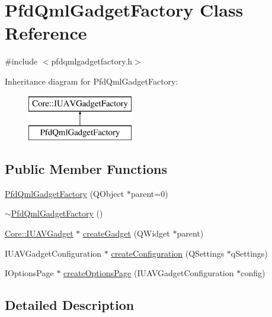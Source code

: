 \hypertarget{class_pfd_qml_gadget_factory}{\section{\-Pfd\-Qml\-Gadget\-Factory \-Class \-Reference}
\label{class_pfd_qml_gadget_factory}
}


{\ttfamily \#include $<$pfdqmlgadgetfactory.\-h$>$}

\-Inheritance diagram for \-Pfd\-Qml\-Gadget\-Factory\-:\begin{figure}[H]
\begin{center}
\leavevmode
\includegraphics[height=2.000000cm]{class_pfd_qml_gadget_factory}
\end{center}
\end{figure}
\subsection*{\-Public \-Member \-Functions}
\begin{DoxyCompactItemize}
\item 
\hyperlink{class_pfd_qml_gadget_factory_a6f9075efdc851baee7311c7033b31e30}{\-Pfd\-Qml\-Gadget\-Factory} (\-Q\-Object $\ast$parent=0)
\item 
\hyperlink{class_pfd_qml_gadget_factory_a8fd3534e971a8d3744837e72bc1bd93c}{$\sim$\-Pfd\-Qml\-Gadget\-Factory} ()
\item 
\hyperlink{class_core_1_1_i_u_a_v_gadget}{\-Core\-::\-I\-U\-A\-V\-Gadget} $\ast$ \hyperlink{class_pfd_qml_gadget_factory_a1c93695c0b81feb818a804d847d2ed6d}{create\-Gadget} (\-Q\-Widget $\ast$parent)
\item 
\-I\-U\-A\-V\-Gadget\-Configuration $\ast$ \hyperlink{class_pfd_qml_gadget_factory_a6dcb32fb151bd18d5f643b991f10d358}{create\-Configuration} (\-Q\-Settings $\ast$q\-Settings)
\item 
\-I\-Options\-Page $\ast$ \hyperlink{class_pfd_qml_gadget_factory_adb0a3b170a57ece58a95bf91998ef8eb}{create\-Options\-Page} (\-I\-U\-A\-V\-Gadget\-Configuration $\ast$config)
\end{DoxyCompactItemize}


\subsection{\-Detailed \-Description}


